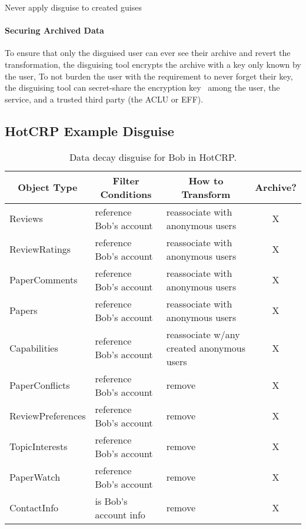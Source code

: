 Never apply disguise to created guises


\paragraph{Securing Archived Data}
To ensure that only the disguised user can ever see their archive and revert the transformation, the disguising tool
encrypts the archive with a key only known by the user, To not burden the user with the requirement to never
forget their key, the disguising tool can secret-share the encryption key~\cite{secretsharing} among the
user, the service, and a trusted third party (\eg the ACLU or EFF).

\iffalse
\subsection{HotCRP Example Disguise}
\begin{table*}[t!]
\begin{tabular}{@{}l|l|l|c@{}}
    \multicolumn{1}{c}{\textbf{Object Type}} & 
    \multicolumn{1}{c}{\textbf{Filter Conditions}} &
    \multicolumn{1}{c}{\textbf{How to Transform}}  &
    \multicolumn{1}{c}{\textbf{Archive?}} \\ 
    \hline
    Reviews & reference Bob's account & reassociate with anonymous users & X\\
    ReviewRatings & reference Bob's account & reassociate with anonymous users & X \\
    PaperComments & reference Bob's account & reassociate with anonymous users & X \\
    Papers 
        & reference Bob's account %
        & reassociate with anonymous users & X\\
    Capabilities & reference Bob's account & reassociate w/any created anonymous users & X \\
    PaperConflicts & reference Bob's account & remove & X \\
    ReviewPreferences & reference Bob's account & remove &  X \\
    TopicInterests & reference Bob's account & remove &  X \\
    PaperWatch & reference Bob's account & remove & X \\
    ContactInfo & is Bob's account info & remove & X \\
\end{tabular}

    \caption{Data decay disguise for Bob in HotCRP.}
    \label{tab:hotcrp}
\end{table*}

